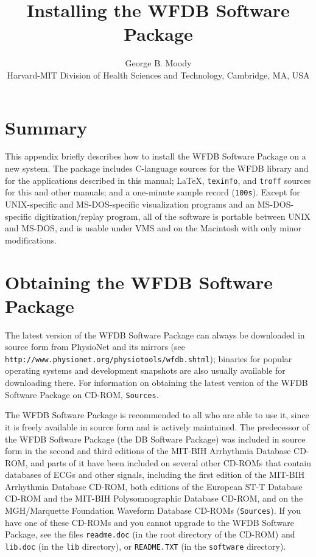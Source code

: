 \documentclass[twoside]{article}
\title{Installing the WFDB Software Package}
\author{George B. Moody\\
Harvard-MIT Division of Health Sciences and Technology, Cambridge, MA, USA}
\date{}
\begin{document}
\setcounter{page}{106}

\maketitle

\section*{Summary}
This appendix briefly describes how to install the WFDB Software Package on a
new system.  The package includes C-language sources for the WFDB library and
for the applications described in this manual; \LaTeX{}, {\tt texinfo}, and
{\tt troff} sources for this and other manuals; and a one-minute sample record
({\tt 100s}).  Except for UNIX-specific and MS-DOS-specific visualization
programs and an MS-DOS-specific digitization/replay program, all of the
software is portable between UNIX and MS-DOS, and is usable under VMS and on
the Macintosh with only minor modifications.

\section*{Obtaining the WFDB Software Package}
The latest version of the WFDB Software Package can always be downloaded in
source form from PhysioNet and its mirrors (see
{\tt http://www.physio\-net.org/physio\-tools/wfdb.shtml}); binaries for
popular operating systems and development snapshots are also usually available
for downloading there.  For information on obtaining the latest version of the
WFDB Software Package on CD-ROM, {\tt Sources}.

The WFDB Software Package is recommended to all who are able to use it, since
it is freely available in source form and is actively maintained.  The
predecessor of the WFDB Software Package (the DB Software Package) was included
in source form in the second and third editions of the MIT-BIH Arrhythmia
Database CD-ROM, and parts of it have been included on several other CD-ROMs
that contain databases of ECGs and other signals, including the first edition
of the MIT-BIH Arrhythmia Database CD-ROM, both editions of the European ST-T
Database CD-ROM and the MIT-BIH Polysomnographic Database CD-ROM, and on the
MGH/Marquette Foundation Waveform Database CD-ROMs ({\tt Sources}).  If you
have one of these CD-ROMs and you cannot upgrade to the WFDB Software Package,
see the files {\tt readme.doc} (in the root directory of the CD-ROM) and
{\tt lib.doc} (in the {\tt lib} directory), or {\tt README.TXT} (in the
{\tt software} directory).
\end{document}

